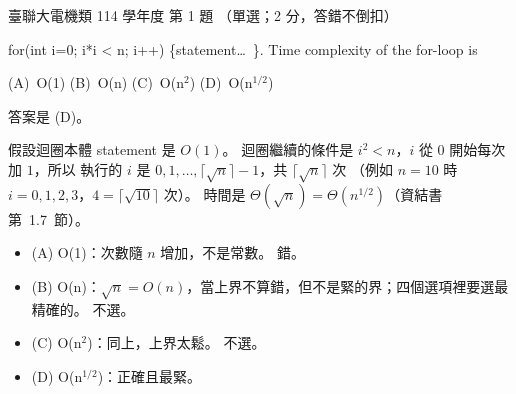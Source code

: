 \begin{pastexam}[label={px:ust-114-ee-ds-01}]{臺聯大電機類 114 學年度 第 1 題}
（單選；2 分，答錯不倒扣）

for(int i=0; i*i < n; i++) \{statement\ldots\ \}. Time complexity of the for-loop is

(A)~O(1) \qquad (B)~O(n) \qquad (C)~O(n$^2$) \qquad (D)~O(n$^{1/2}$)
\end{pastexam}

\begin{pastsoln}
答案是 (D)。

假設迴圈本體 statement 是 $O(1)$。 迴圈繼續的條件是 $i^2 < n$，$i$ 從 $0$ 開始每次加 $1$，所以
執行的 $i$ 是 $0, 1, \ldots, \lceil \sqrt n \rceil - 1$，共 $\lceil \sqrt n \rceil$ 次
（例如 $n = 10$ 時 $i = 0, 1, 2, 3$，$4 = \lceil \sqrt{10} \rceil$ 次）。 時間是
$\Theta(\sqrt n) = \Theta(n^{1/2})$（資結書第~1.7~節）。
\begin{itemize}
\item (A) O(1)：次數隨 $n$ 增加，不是常數。 錯。
\item (B) O(n)：$\sqrt n = O(n)$，當上界不算錯，但不是緊的界；四個選項裡要選最精確的。 不選。
\item (C) O(n$^2$)：同上，上界太鬆。 不選。
\item (D) O(n$^{1/2}$)：正確且最緊。
\end{itemize}
\end{pastsoln}
